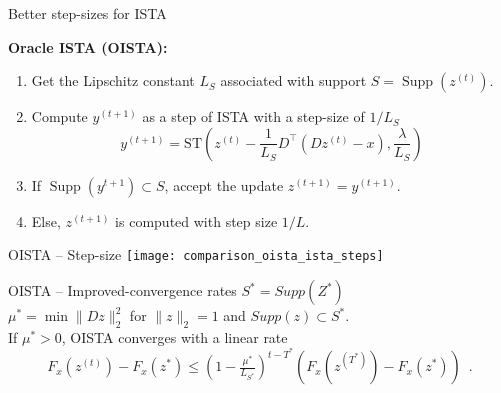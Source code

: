 \documentclass{beamer}
\DeclareMathOperator*{\supp}{Supp}
\begin{document}
\begin{frame}{Better step-sizes for ISTA}

    {\bf \large Oracle ISTA (OISTA):\\[1em]}
    \begin{enumerate}\itemsep1em
        \item Get the Lipschitz constant $L_S$ associated with support $S = \supp(z^{(t)})$.
        \item Compute $y^{(t+1)}$ as a step of ISTA with a step-size of $1/L_S$
        \[
        y^{(t+1)} = \text{ST}\left(z^{(t)}
        - \frac{1}{L_S}D^\top(D z^{(t)} - x),
        \frac{\lambda}{L_S}\right)
        \]
        \item If $\supp(y^{t+1}) \subset S$, accept the update $z^{(t+1)} = y^{(t+1)}$.
        \item Else, $z^{(t+1)}$ is computed with step size $1/L$.
    \end{enumerate}
\end{frame}


\begin{frame}{OISTA -- Step-size}
    \centering
    \texttt{[image: comparison\_oista\_ista\_steps]}\\
\end{frame}


\begin{frame}{OISTA -- Improved-convergence rates}
    $S^* = Supp(Z^*)$\\[.5em]
    $\mu^* = \min \|Dz\|_2^2$ for $\|z\|_2 = 1$
    and $Supp(z)\subset S^*$.\\[2em]

    If $\mu^* > 0$, OISTA converges with a linear rate
    \[
        F_x(z^{(t)}) - F_x(z^*) \leq
            (1 - \tfrac{\mu^*}{L_{S^*}})^{t - T^*}(F_x(z^{(T^*)}) - F_x(z^*))\enspace .
    \]
\end{frame}
\end{document}
